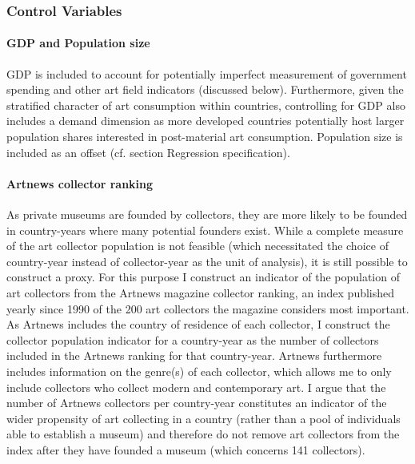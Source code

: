 \documentclass[11pt]{article}
\begin{document}
\subsubsection*{Control Variables}

\paragraph*{GDP and Population size}

GDP is included to account for potentially imperfect measurement of government spending and other art field indicators (discussed below). 
Furthermore, given the stratified character of art consumption \parencite{Bourdieu_1984_distinction} within countries, controlling for GDP also includes a demand dimension as more developed countries potentially host larger population shares interested in post-material art consumption.
Population size is included as an offset (cf. section Regression specification). 



\paragraph*{Artnews collector ranking}

As private museums are founded by collectors, they are more likely to be founded in country-years where many potential founders exist.
While a complete measure of the art collector population is not feasible (which necessitated the choice of country-year instead of collector-year as the unit of analysis), it is still possible to construct a proxy. 
For this purpose I construct an indicator of the population of art collectors from the Artnews magazine collector ranking, an index published yearly since 1990 of the 200 art collectors the magazine considers most important.
As Artnews includes the country of residence of each collector, I construct the collector population indicator for a country-year as the number of collectors included in the Artnews ranking for that country-year.
Artnews furthermore includes information on the genre(s) of each collector, which allows me to only include collectors who collect modern and contemporary art.
I argue that the number of Artnews collectors per country-year constitutes an indicator of the wider propensity of art collecting in a country (rather than a pool of individuals able to establish a museum) and therefore do not remove art collectors from the index after they have founded a museum (which concerns 141 collectors).
\end{document}
